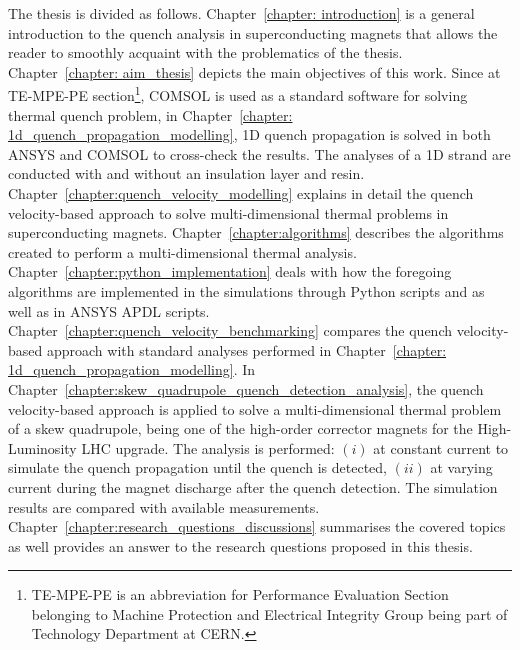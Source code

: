 
The thesis is divided as follows. Chapter~\ref{chapter: introduction} is a general introduction to the quench analysis in superconducting magnets that allows the reader to smoothly acquaint with the problematics of the thesis. Chapter~\ref{chapter: aim_thesis} depicts the main objectives of this work. Since at TE-MPE-PE section\footnote{TE-MPE-PE is an abbreviation for Performance Evaluation Section belonging to Machine Protection and Electrical Integrity Group being part of Technology Department at CERN.}, COMSOL is used as a standard software for solving thermal quench problem, in Chapter~\ref{chapter: 1d_quench_propagation_modelling}, 1D quench propagation is solved in both ANSYS and COMSOL to cross-check the results. The analyses of a 1D strand are conducted with and without an insulation layer and resin. Chapter~\ref{chapter:quench_velocity_modelling} explains in detail the quench velocity-based approach to solve multi-dimensional thermal problems in superconducting magnets.
Chapter~\ref{chapter:algorithms} describes the algorithms created to perform a multi-dimensional thermal analysis. Chapter~\ref{chapter:python_implementation} deals with how the foregoing algorithms are implemented in the simulations through Python scripts and as well as in ANSYS APDL scripts. Chapter~\ref{chapter:quench_velocity_benchmarking} compares the quench velocity-based approach with standard analyses performed in Chapter~\ref{chapter: 1d_quench_propagation_modelling}. In Chapter~\ref{chapter:skew_quadrupole_quench_detection_analysis}, the quench velocity-based approach is applied to solve a multi-dimensional thermal problem of a skew quadrupole, being one of the high-order corrector magnets for the High-Luminosity LHC upgrade. The analysis is performed: $(i)$ at constant current to simulate the quench propagation until the quench is detected, $(ii)$ at varying current during the magnet discharge after the quench detection. The simulation results are compared with available measurements. Chapter~\ref{chapter:research_questions_discussions} summarises the covered topics as well provides an answer to the research questions proposed in this thesis.

